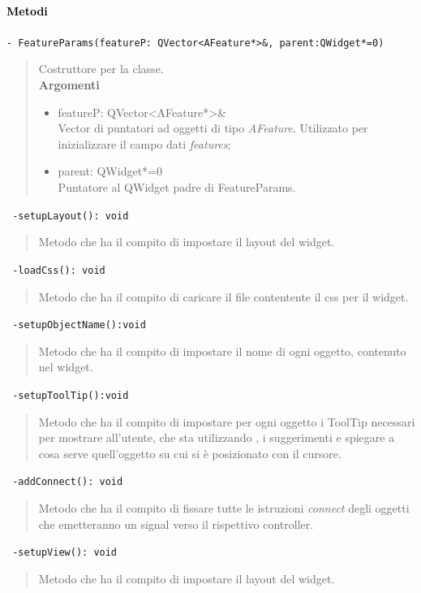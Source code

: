 \paragraph{\textcolor{black}{Metodi\\}}
\color{blue}\verb!- FeatureParams(featureP: QVector<AFeature*>&, parent:QWidget*=0)!
\begin{quote}
\color{black}Costruttore per la classe. \\
\textbf{Argomenti}
\begin{itemize}
\item featureP: QVector<AFeature*>\& \\ Vector di puntatori ad oggetti di tipo \emph{AFeature}. Utilizzato per inizializzare il campo dati \emph{features};
\item parent: QWidget*=0  \\ Puntatore al QWidget padre di FeatureParams.
\end{itemize}
\end{quote}
\color{blue}\verb! -setupLayout(): void !
\begin{quote}
\color{black} Metodo che ha il compito di impostare il layout del widget.
\end{quote} 
\color{blue}\verb! -loadCss(): void !
\begin{quote}
\color{black} Metodo che ha il compito di caricare il file contentente il css per il widget.
\end{quote} 
\color{blue}\verb! -setupObjectName():void!
\begin{quote}
\color{black} Metodo che ha il compito di impostare il nome di ogni oggetto, contenuto nel widget.
\end{quote} 
\color{blue}\verb! -setupToolTip():void!
\begin{quote}
\color{black} Metodo che ha il compito di impostare per ogni oggetto i ToolTip necessari per mostrare all'utente, che sta utilizzando \project{}, i suggerimenti e  spiegare a cosa serve quell'oggetto su cui si è posizionato con il cursore.
\end{quote} 
\color{blue}\verb! -addConnect(): void!
\color{black} 
\begin{quote}
Metodo che ha il compito di fissare tutte le istruzioni \emph{connect} degli oggetti che emetteranno un signal\g{} verso il rispettivo controller.
\end{quote} 
\color{blue}\verb! -setupView(): void !
\begin{quote}
\color{black} Metodo che ha il compito di impostare il layout del widget.
\end{quote} 
